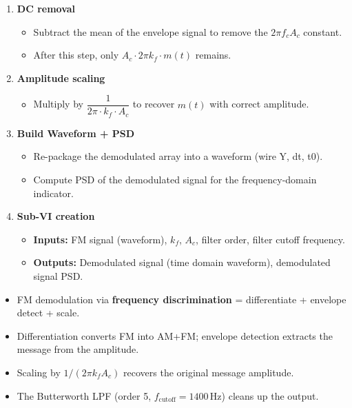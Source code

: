 \documentclass[../../main.tex]{subfiles}
\begin{document}
\begin{enumerate}[leftmargin=2em]
\item \textbf{DC removal}
  \begin{itemize}[leftmargin=1.5em]
    \item Subtract the mean of the envelope signal to remove the $2\pi f_c A_c$ constant.
    \item After this step, only $A_c \cdot 2\pi k_f \cdot m(t)$ remains.
  \end{itemize}

\item \textbf{Amplitude scaling}
  \begin{itemize}[leftmargin=1.5em]
    \item Multiply by $\dfrac{1}{2\pi \cdot k_f \cdot A_c}$ to recover $m(t)$ with correct amplitude.
  \end{itemize}

\item \textbf{Build Waveform + PSD}
  \begin{itemize}[leftmargin=1.5em]
    \item Re-package the demodulated array into a waveform (wire Y, dt, t0).
    \item Compute PSD of the demodulated signal for the frequency-domain indicator.
  \end{itemize}

\item \textbf{Sub-VI creation}
  \begin{itemize}[leftmargin=1.5em]
    \item \textbf{Inputs:} FM signal (waveform), $k_f$, $A_c$, filter order, filter cutoff frequency.
    \item \textbf{Outputs:} Demodulated signal (time domain waveform), demodulated signal PSD.
  \end{itemize}

\end{enumerate}

\vspace{1em}

\begin{SummaryBox}
\begin{itemize}[leftmargin=1.5em]
  \item FM demodulation via \textbf{frequency discrimination} = differentiate + envelope detect + scale.
  \item Differentiation converts FM into AM+FM; envelope detection extracts the message from the amplitude.
  \item Scaling by $1/(2\pi k_f A_c)$ recovers the original message amplitude.
  \item The Butterworth LPF (order 5, $f_\text{cutoff} = 1400$\,Hz) cleans up the output.
\end{itemize}
\end{SummaryBox}
\end{document}
